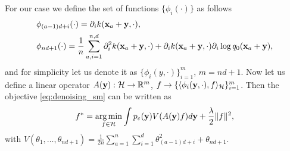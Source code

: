 For our case we define the set of functions $\{\phi_i(\cdot)\}$ as follows
\begin{align*}
    &\phi_{(a - 1)d + i}(\cdot) = \partial_i k({\bf x}_a + {\bf y}, \cdot),\\
    &\phi_{nd + 1}(\cdot) = \frac{1}{n}\sum\limits_{a, i = 1}^{n, d} \partial_i^2 k({\bf x}_a + {\bf y}, \cdot) + \partial_i k({\bf x}_a + {\bf y}, \cdot)\partial_i \log q_0({\bf x}_a + {\bf y}),
\end{align*}
and for simplicity let us denote it as $\{\phi_i(y, \cdot)\}_{i = 1}^m$, $m = nd + 1$.
Now let us define a linear operator
$A({\bf y}): \mathcal{H} \to \mathbb{R}^m$, $f \to \{\langle\phi_i({\bf y}, \cdot),
f\rangle_\mathcal{H}\}_{i = 1}^m$.
Then the objective \eqref{eq:denoising_sm} can be written as
\begin{equation}
    \label{eq:denoising_objective_rkhs}
    f^* = \operatorname*{arg\,min}_{f \in \mathcal{H}} \int p_{\varepsilon}({\bf y})V(A({\bf y})f)d{\bf y}
    + \frac{\lambda}{2}\|f\|^2,
\end{equation}
with $V(\theta_1, \ldots, \theta_{nd + 1}) =
\frac{1}{2n}\sum\limits_{a = 1}^n\sum\limits_{i = 1}^d\theta^2_{(a - 1)d + i} +
\theta_{nd + 1}$.

